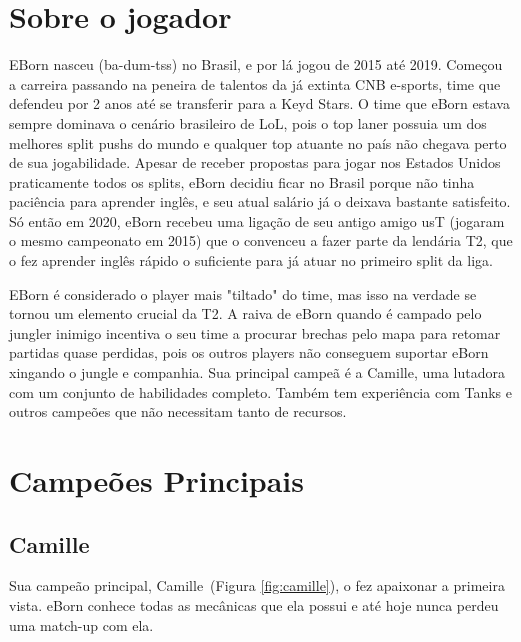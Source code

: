 \begin{multicols}{2} 
	\section*{Sobre o jogador}
	EBorn nasceu (ba-dum-tss) no Brasil, e por lá jogou de 2015 até 2019. Começou a carreira passando na peneira de talentos da já extinta CNB e-sports, time que defendeu por 2 anos até se transferir para a Keyd Stars. O time que eBorn estava sempre dominava o cenário brasileiro de LoL, pois o top laner possuia um dos melhores split pushs do mundo e qualquer top atuante no país não chegava perto de sua jogabilidade. Apesar de receber propostas para jogar nos Estados Unidos praticamente todos os splits, eBorn decidiu ficar no Brasil porque não tinha paciência para aprender inglês, e seu atual salário já o deixava bastante satisfeito. Só então em 2020, eBorn recebeu uma ligação de seu antigo amigo usT (jogaram o mesmo campeonato em 2015) que o convenceu a fazer parte da lendária T2, que o fez aprender inglês rápido o suficiente para já atuar no primeiro split da liga.
	
	EBorn é considerado o player mais "tiltado"\cite{nascimento} do time, mas isso na verdade se tornou um elemento crucial da T2. A raiva de eBorn quando é campado pelo jungler inimigo incentiva o seu time a procurar brechas pelo mapa para retomar partidas quase perdidas, pois os outros players não conseguem suportar eBorn xingando o jungle e companhia\cite{seng}. Sua principal campeã é a Camille, uma lutadora com um conjunto de habilidades completo. Também tem experiência com Tanks e outros campeões que não necessitam tanto de recursos.
	
	\section*{Campeões Principais}
	\subsection*{Camille}
	Sua campeão principal, Camille~(Figura \ref{fig:camille}), o fez apaixonar a primeira vista. eBorn conhece todas as mecânicas que ela possui e até hoje nunca perdeu uma match-up com ela.
	

\end{multicols}
